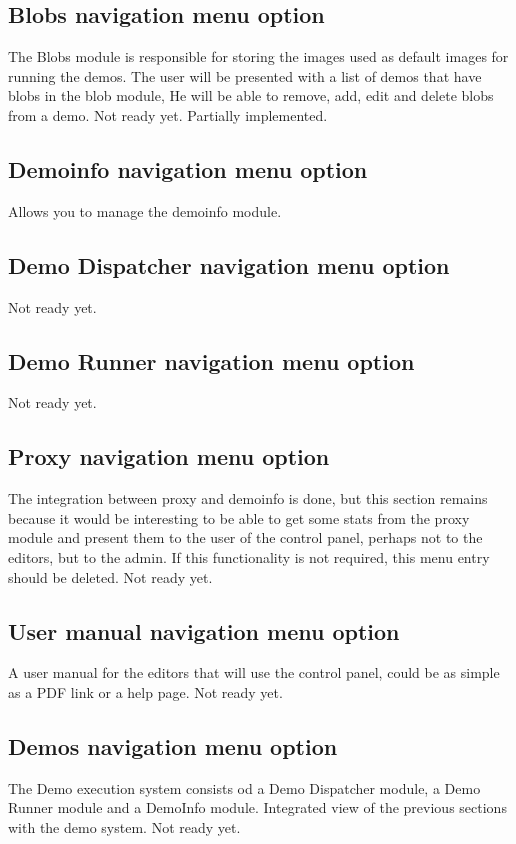 \subsection{Blobs navigation menu option}
The Blobs module is responsible for storing the images used as default images for running the demos.
The user will be presented with a list of demos that have blobs in the blob module,
He will be able to remove, add, edit and delete blobs from a demo.
Not ready yet. Partially implemented.

\subsection{Demoinfo navigation menu option}
Allows you to manage the demoinfo module.


\subsection{Demo Dispatcher navigation menu option}
Not ready yet.

\subsection{Demo Runner navigation menu option}
Not ready yet.

\subsection{Proxy navigation menu option}
The integration between proxy and demoinfo is done, but this section remains because it would be interesting to be able to get some stats from the proxy module and present them to the user of the control panel, perhaps not to the editors, but to the admin.
If this functionality is not required, this menu entry should be deleted.
Not ready yet.

\subsection{User manual navigation menu option}
A user manual for the editors that will use the control panel, could be as simple as a PDF link or a help page.
Not ready yet.

\subsection{Demos navigation menu option}
The Demo execution system consists od a Demo Dispatcher module, a Demo Runner module and a DemoInfo module.
Integrated view of the previous sections with the demo system.
Not ready yet.

